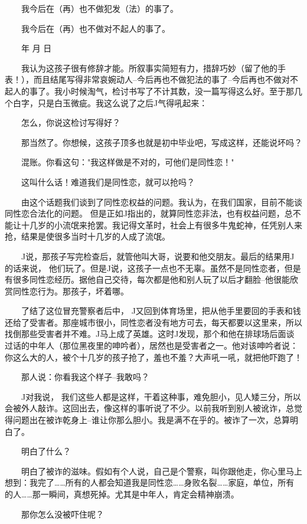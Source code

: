  　　我今后在（再）也不做犯发（法）的事了。 
 
 　　我今后在（再）也不做对不起人的事了。 
 
 　　年 月 日 
 
 　　我认为这孩子很有修辞才能。所叙事实简短有力，措辞巧妙（留了他的手表！），而且结尾写得非常哀婉动人--今后再也不做犯法的事了--今后再也不做对不起人的事了。我小时候淘气，检讨书写了不计其数，没一篇写得这么好。至于那几个白字，只是白玉微疵。我这么说了之后J气得吼起来： 
 
 　　怎么，你说这检讨写得好？ 
 
 　　那当然了。你想候，这孩子顶多也就是初中毕业吧，写成这样，还能说坏吗？ 
 
 　　混账。你看这句："我这样做是不对的，可他们是同性恋！" 
 
 　　这叫什么话！难道我们是同性恋，就可以抢吗？ 
 
 　　由这个话题我们谈到了同性恋权益的问题。我认为，在我们国家，目前不能谈同性恋合法化的问题。 但是正如J指出的，就算同性恋非法，也有权益问题，总不能让十几岁的小流氓来抢罢。我记得文革时，社会上有很多牛鬼蛇神，任凭别人来抢，结果是使很多当时十几岁的人成了流氓。 
 
 　　J说，那孩子写完检查后，就管他叫大哥，说要和他交朋友。最后的结果用J的话来说， 他们玩了。但是J说，这孩子一点也不无辜。虽然不是同性恋者，但是有很多同性恋经历。据他自己交待，每次都是他和别人玩了以后才翻脸--他很能欣赏同性恋行为。那孩子，坏着哪。 
 
 　　了结了这位冒充警察者后中， J又回到体育场里，把从他手里要回的手表和钱还给了受害者。那座城市很小，同性恋者没有地方可去，每天都要以这里来，所以找倒那些受害者并不难。J马上成了英雄。这时J发现，那个和他在排球场后面谈过话的中年人（那位黑夜里的呻吟者），居然也是受害者之一。他对该呻吟者说：你这么大的人，被个十几岁的孩子抢了，羞也不羞？大声吼一吼，就把他吓跑了！ 
 
 　　那人说：你看我这个样子--我敢吗？ 
 
 　　J对我说， 我们这些人都是这样，干着这种事，难免胆小，见人矮三分，所以会被外人敲诈。这回出去，像这样的事听说了不少。以前我听到别人被讹诈，总觉得问题出在被诈乾身上--谁让你那么胆小。我是满不在乎的。被诈了一次，总算明白了。 
 
 　　明白了什么？ 
 
 　　明白了被诈的滋味。假如有个人说，自己是个警察，叫你跟他走，你心里马上想到：我完了……所有的人都会知道我是同性恋……身败名裂……家庭，单位，所有的人……那一瞬间，真想死掉。尤其是中年人，肯定会精神崩溃。 
 
 　　那你怎么没被吓住呢？ 
 
